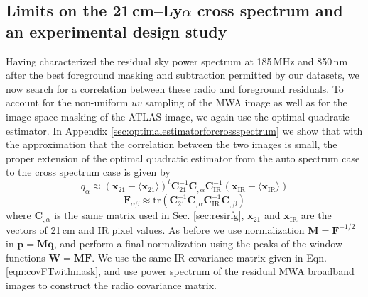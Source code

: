 \documentclass[numberedappendix]{emulateapj}
\newcommand{\IR}{\text{IR}}
\newcommand{\Fb}{\mathbf{F}}
\newcommand{\Mb}{\mathbf{M}}
\newcommand{\Cb}{\mathbf{C}}
\newcommand{\xb}{\mathbf{x}}
\newcommand{\pb}{\mathbf{p}}
\newcommand{\qb}{\mathbf{q}}
\newcommand{\Wb}{\mathbf{W}}
\begin{document}
\subsection{Limits on the 21\,cm--Ly$\alpha$ cross spectrum and an experimental design study}
\label{sec:limitsandexptdesignstudy}

Having characterized the residual sky power spectrum at 185\,MHz and 850\,nm after the best foreground masking and subtraction permitted by our datasets, we now search for a correlation between these radio and foreground residuals. To account for the non-uniform $uv$ sampling of the MWA image as well as for the image space masking of the ATLAS image, we again use the optimal quadratic estimator. In Appendix \ref{sec:optimalestimatorforcrossspectrum} we show that with the approximation that the correlation between the two images is small, the proper extension of the optimal quadratic estimator from the auto spectrum case to the cross spectrum case is given by
\begin{equation}
q_\alpha \approx (\xb_{21}-\langle\xb_{21}\rangle)^t \Cb_{21}^{-1} \Cb_{,\alpha}\Cb_\IR^{-1}(\xb_\IR-\langle\xb_\IR\rangle)
\end{equation}
\begin{equation}
\Fb_{\alpha\beta}\approx\text{tr}\left(\Cb_{21}^{-1} \Cb_{,\alpha} \Cb_\IR^{-1}  \Cb_{,\beta}  \right)	
\end{equation}
where $\Cb_{,\alpha}$ is the same matrix used in Sec. \ref{sec:resirfg}, $\mathbf{x}_{21}$ and $\mathbf{x}_{\IR}$ are the vectors of 21\,cm and IR pixel values. As before we use normalization $\Mb=\Fb^{-1/2}$ in $\pb=\Mb\qb$, and perform a final normalization using the peaks of the window functions $\Wb=\Mb\Fb$. We use the same IR covariance matrix given in Eqn. \ref{eqn:covFTwithmask}, and use power spectrum of the residual MWA broadband images to construct the radio covariance matrix.
\end{document}
